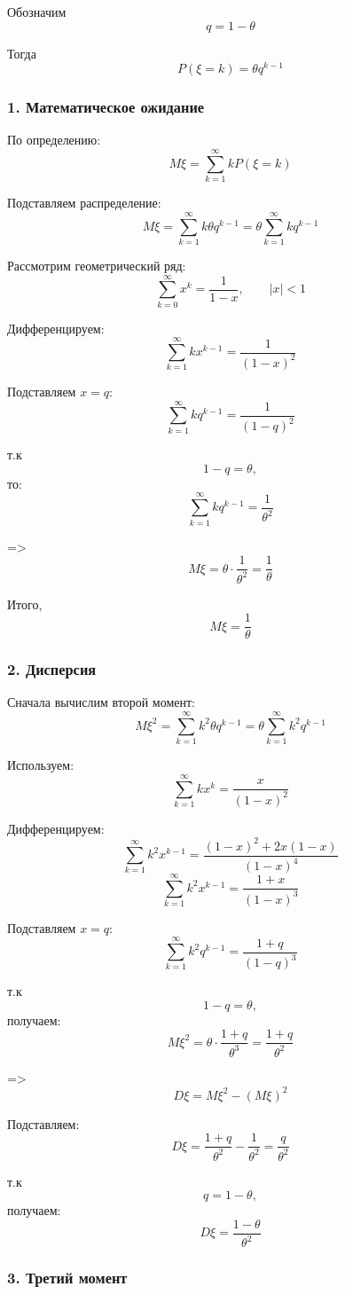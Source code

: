 \documentclass[12pt,a4paper]{article}
\theoremstyle{definition}
\begin{document}
Обозначим
\[q=1-\theta\]

Тогда
\[P(\xi=k)=\theta q^{k-1}\]

\subsubsection*{1. Математическое ожидание}

По определению:
\[M\xi=\sum_{k=1}^{\infty}kP(\xi=k)\]

Подставляем распределение:
\[M\xi=\sum_{k=1}^{\infty}k\theta q^{k-1}=\theta\sum_{k=1}^{\infty}kq^{k-1}\]

Рассмотрим геометрический ряд:
\[\sum_{k=0}^{\infty}x^k=\frac1{1-x},\qquad |x|<1\]

Дифференцируем:
\[\sum_{k=1}^{\infty}kx^{k-1}=\frac1{(1-x)^2}\]

Подставляем $x=q$:
\[\sum_{k=1}^{\infty}kq^{k-1}=\frac1{(1-q)^2}\]

т.к
\[1-q=\theta,\]
то:
\[\sum_{k=1}^{\infty}kq^{k-1}=\frac1{\theta^2}\]

=>
\[M\xi=\theta\cdot\frac1{\theta^2}=\frac1{\theta}\]

Итого,
\[\boxed{M\xi=\frac1{\theta}}\]

\subsubsection*{2. Дисперсия}

Сначала вычислим второй момент:
\[M\xi^2=\sum_{k=1}^{\infty}k^2\theta q^{k-1}=\theta\sum_{k=1}^{\infty}k^2q^{k-1}\]

Используем:
\[\sum_{k=1}^{\infty}kx^k=\frac{x}{(1-x)^2}\]

Дифференцируем:
\[\sum_{k=1}^{\infty}k^2x^{k-1}=\frac{(1-x)^2+2x(1-x)}{(1-x)^4}\]
\[\sum_{k=1}^{\infty}k^2x^{k-1}=\frac{1+x}{(1-x)^3}\]

Подставляем $x=q$:
\[\sum_{k=1}^{\infty}k^2q^{k-1}=\frac{1+q}{(1-q)^3}\]

т.к
\[1-q=\theta,\]
получаем:
\[M\xi^2=\theta\cdot\frac{1+q}{\theta^3}=\frac{1+q}{\theta^2}\]

=>
\[D\xi=M\xi^2-(M\xi)^2\]

Подставляем:
\[D\xi=\frac{1+q}{\theta^2}-\frac1{\theta^2}=\frac{q}{\theta^2}\]

т.к
\[q=1-\theta,\]
получаем:
\[\boxed{D\xi=\frac{1-\theta}{\theta^2}}\]

\subsubsection*{3. Третий момент}
\end{document}
